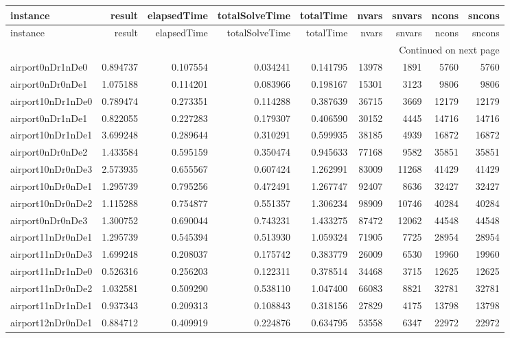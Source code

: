 
\begin{longtable}{|l|r|r|r|r|r|r|r|r|}
\toprule
instance & result & elapsedTime & totalSolveTime & totalTime & nvars & snvars & ncons & sncons \\
\midrule
\endfirsthead
\toprule
instance & result & elapsedTime & totalSolveTime & totalTime & nvars & snvars & ncons & sncons \\
\midrule
\endhead
\midrule
\multicolumn{9}{r}{Continued on next page} \\
\midrule
\endfoot
\bottomrule
\endlastfoot
airport0nDr1nDe0 & 0.894737 & 0.107554 & 0.034241 & 0.141795 & 13978 & 1891 & 5760 & 5760 \\
airport0nDr0nDe1 & 1.075188 & 0.114201 & 0.083966 & 0.198167 & 15301 & 3123 & 9806 & 9806 \\
airport10nDr1nDe0 & 0.789474 & 0.273351 & 0.114288 & 0.387639 & 36715 & 3669 & 12179 & 12179 \\
airport0nDr1nDe1 & 0.822055 & 0.227283 & 0.179307 & 0.406590 & 30152 & 4445 & 14716 & 14716 \\
airport10nDr1nDe1 & 3.699248 & 0.289644 & 0.310291 & 0.599935 & 38185 & 4939 & 16872 & 16872 \\
airport0nDr0nDe2 & 1.433584 & 0.595159 & 0.350474 & 0.945633 & 77168 & 9582 & 35851 & 35851 \\
airport10nDr0nDe3 & 2.573935 & 0.655567 & 0.607424 & 1.262991 & 83009 & 11268 & 41429 & 41429 \\
airport10nDr0nDe1 & 1.295739 & 0.795256 & 0.472491 & 1.267747 & 92407 & 8636 & 32427 & 32427 \\
airport10nDr0nDe2 & 1.115288 & 0.754877 & 0.551357 & 1.306234 & 98909 & 10746 & 40284 & 40284 \\
airport0nDr0nDe3 & 1.300752 & 0.690044 & 0.743231 & 1.433275 & 87472 & 12062 & 44548 & 44548 \\
airport11nDr0nDe1 & 1.295739 & 0.545394 & 0.513930 & 1.059324 & 71905 & 7725 & 28954 & 28954 \\
airport11nDr0nDe3 & 1.699248 & 0.208037 & 0.175742 & 0.383779 & 26009 & 6530 & 19960 & 19960 \\
airport11nDr1nDe0 & 0.526316 & 0.256203 & 0.122311 & 0.378514 & 34468 & 3715 & 12625 & 12625 \\
airport11nDr0nDe2 & 1.032581 & 0.509290 & 0.538110 & 1.047400 & 66083 & 8821 & 32781 & 32781 \\
airport11nDr1nDe1 & 0.937343 & 0.209313 & 0.108843 & 0.318156 & 27829 & 4175 & 13798 & 13798 \\
airport12nDr0nDe1 & 0.884712 & 0.409919 & 0.224876 & 0.634795 & 53558 & 6347 & 22972 & 22972 \\

\end{longtable}
